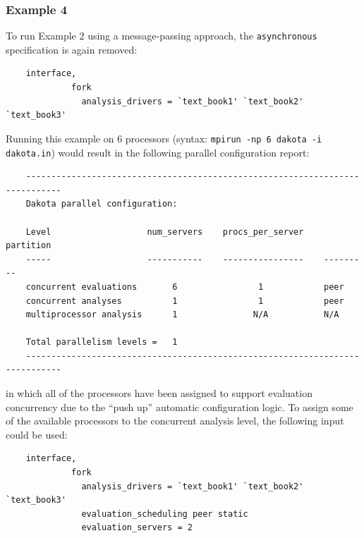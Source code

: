 \subsubsection{Example 4}\label{parallel:spec:multi:example4}

To run Example 2 using a message-passing approach, the
\texttt{asynchronous} specification is again removed:
\begin{small}
\begin{verbatim}
    interface,
             fork
               analysis_drivers = `text_book1' `text_book2' `text_book3'
\end{verbatim}
\end{small}

Running this example on 6 processors (syntax: \texttt{mpirun -np 6
  dakota -i dakota.in}) would result in the following parallel
configuration report:
\begin{small}
\begin{verbatim}
    -----------------------------------------------------------------------------
    Dakota parallel configuration:

    Level                   num_servers    procs_per_server    partition
    -----                   -----------    ----------------    ---------
    concurrent evaluations       6                1            peer
    concurrent analyses          1                1            peer
    multiprocessor analysis      1               N/A           N/A

    Total parallelism levels =   1
    -----------------------------------------------------------------------------
\end{verbatim}
\end{small}

in which all of the processors have been assigned to support
evaluation concurrency due to the ``push up'' automatic configuration
logic. To assign some of the available processors to the concurrent 
analysis level, the following input could be used:
\begin{small}
\begin{verbatim}
    interface,
             fork
               analysis_drivers = `text_book1' `text_book2' `text_book3'
               evaluation_scheduling peer static
               evaluation_servers = 2
\end{verbatim}
\end{small}

